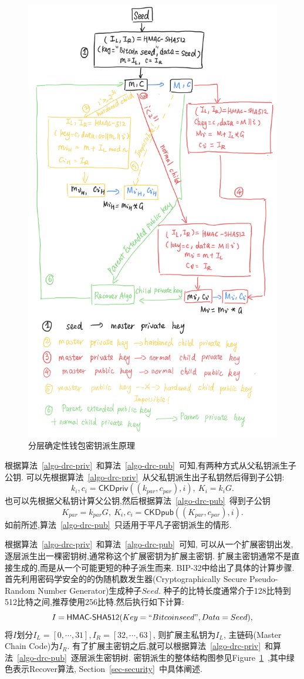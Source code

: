 \begin{figure}
\centering
\includegraphics[width=.7\textwidth]{./outline.png}
\caption{分层确定性钱包密钥派生原理}\label{fig-bip32}
\end{figure}


根据算法~\ref{algo-drc-priv}~和算法~\ref{algo-drc-pub}~可知,有两种方式从父私钥派生子公钥.
可以先根据算法~\ref{algo-drc-priv}~从父私钥派生出子私钥然后得到子公钥:
$$k_i, c_i = \textsf{CKDpriv}((k_{par}, c_{par}), i),\ K_i = k_iG.$$
也可以先根据父私钥计算父公钥,然后根据算法~\ref{algo-drc-pub}~得到子公钥
$$K_{par} = k_{par}G,\ K_i, c_i = \textsf{CKDpub}((K_{par}, c_{par}), i).$$ 
如前所述,算法~\ref{algo-drc-pub}~只适用于平凡子密钥派生的情形.

根据算法~\ref{algo-drc-priv}~和算法~\ref{algo-drc-pub}~可知, 可以从一个扩展密钥出发,
逐层派生出一棵密钥树,通常称这个扩展密钥为扩展主密钥.
扩展主密钥通常不是直接生成的,而是从一个可能更短的种子派生而来.
BIP-32中给出了具体的计算步骤.
首先利用密码学安全的的伪随机数发生器(Cryptographically Secure Pseudo-Random Number Generator)生成种子$Seed$.
种子的比特长度通常介于128比特到512比特之间,推荐使用256比特.然后执行如下计算:
$$I = \textsf{HMAC-SHA512}(Key = ``Bitcoin seed", Data = Seed),$$
将$I$划分$I_L = [0,\cdots,31], I_R = [32,\cdots,63]$,
则扩展主私钥为$I_L$, 主链码(Master Chain Code)为$I_R$.
有了扩展主密钥之后,就可以根据算法~\ref{algo-drc-priv}~和算法~\ref{algo-drc-pub}~逐层派生密钥树.
密钥派生的整体结构图参见Figure~\ref{fig-bip32}~,其中绿色表示Recover算法, Section~\ref{sec-security}~中具体阐述.




